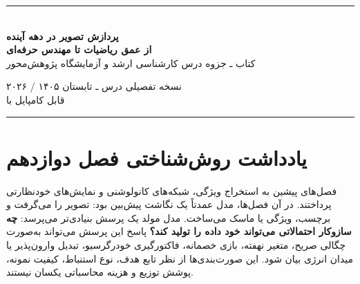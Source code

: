 \documentclass[12pt,openany,oneside]{book}
\begin{document}
\begin{titlepage}
\centering
\vspace*{0.8cm}
{\color{DeepBlue}\rule{0.9\textwidth}{1.1pt}}\\[0.9cm]
{\Huge\bfseries پردازش تصویر در دهه آینده\\[0.3cm]}
{\LARGE\bfseries از عمق ریاضیات تا مهندس حرفه‌ای\\[0.8cm]}
{\Large کتاب ـ جزوه درس کارشناسی ارشد و آزمایشگاه پژوهش‌محور\\[0.9cm]}


\vfill
{\large نسخه تفصیلی درس ـ تابستان ۱۴۰۵ / ۲۰۲۶}\\[0.4cm]
{\normalsize قابل کامپایل با }\\[0.8cm]
{\color{DeepBlue}\rule{0.9\textwidth}{1.1pt}}
\end{titlepage}

\frontmatter

\chapter*{یادداشت روش‌شناختی فصل دوازدهم}
فصل‌های پیشین به استخراج ویژگی، شبکه‌های کانولوشنی و نمایش‌های خودنظارتی پرداختند. در آن فصل‌ها، مدل عمدتاً
یک نگاشت پیش‌بین بود: تصویر را می‌گرفت و برچسب، ویژگی یا ماسک می‌ساخت. مدل مولد یک پرسش بنیادی‌تر می‌پرسد:
\textbf{چه سازوکار احتمالاتی می‌تواند خود داده را تولید کند؟} پاسخ این پرسش می‌تواند به‌صورت چگالی صریح،
متغیر نهفته، بازی خصمانه، فاکتورگیری خودرگرسیو، تبدیل وارون‌پذیر یا میدان انرژی بیان شود. این صورت‌بندی‌ها
از نظر تابع هدف، نوع استنباط، کیفیت نمونه، پوشش توزیع و هزینه محاسباتی یکسان نیستند.
\end{document}
